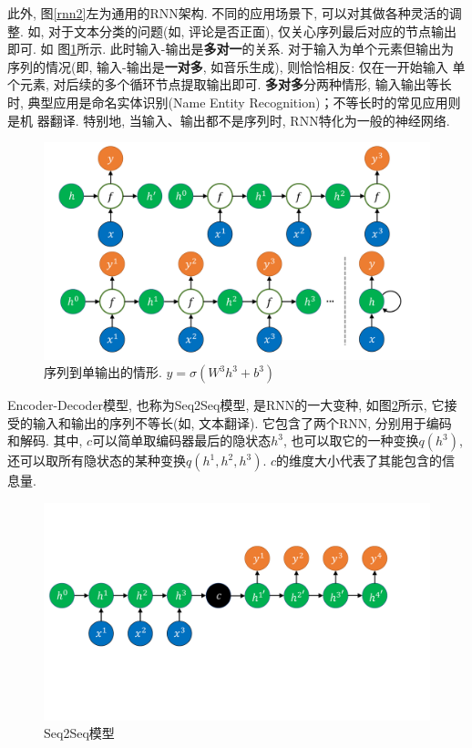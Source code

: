 \documentclass[UTF8, twocolumn]{ctexart}
\begin{document}
此外, 图\ref{rnn2}左为通用的RNN架构. 不同的应用场景下, 可以对其做各种灵活的调整. 
如, 对于文本分类的问题(如, 评论是否正面), 仅关心序列最后对应的节点输出即可. 如
图\ref{rnn3}所示. 此时输入-输出是{\bf 多对一}的关系. 对于输入为单个元素但输出为
序列的情况(即, 输入-输出是{\bf 一对多}, 如音乐生成), 则恰恰相反: 仅在一开始输入
单个元素, 对后续的多个循环节点提取输出即可. {\bf 多对多}分两种情形, 输入输出等长
时, 典型应用是命名实体识别(Name Entity Recognition)；不等长时的常见应用则是机
器翻译. 特别地, 当输入、输出都不是序列时, RNN特化为一般的神经网络. 


\begin{figure}[!hbt]
    \center
    \includegraphics[width=.6\linewidth]{rnn3.pdf}
    \caption{序列到单输出的情形. $y=\sigma(W^3h^3 + b^3)$}
    \label{rnn3}
\end{figure}


Encoder-Decoder模型, 也称为Seq2Seq模型, 是RNN的一大变种, 如图\ref{rnn4}所示, 
它接受的输入和输出的序列不等长(如, 文本翻译). 它包含了两个RNN, 分别用于编码
和解码. 其中, $c$可以简单取编码器最后的隐状态$h^3$, 也可以取它的一种变换$q(h^3)$, 
还可以取所有隐状态的某种变换$q(h^1, h^2, h^3)$. $c$的维度大小代表了其能包含的信
息量. 



\begin{figure}[!hbt]
    \center
    \includegraphics[width=.9\linewidth]{rnn4.pdf}
    \caption{Seq2Seq模型}
    \label{rnn4}
\end{figure}
\end{document}
